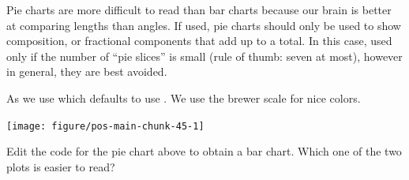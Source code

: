 \documentclass[krantz2]{krantz}\usepackage{knitr}
\begin{document}
\begin{warningbox}
Pie charts are more difficult to read than bar charts because our brain is better at comparing lengths than angles. If used, pie charts should only be used to show composition, or fractional components that add up to a total. In this case, used only if the number of “pie slices” is small (rule of thumb: seven at most), however in general, they are best avoided.
\end{warningbox}

As we use  which defaults to use . We use the brewer scale for nice colors.

\begin{knitrout}\footnotesize
{}\color{fgcolor}\begin{kframe}
\begin{alltt}
\hlstd{(}  \hlstd{(} \hlstd{=} \hlstd{(}\hlstd{),}  \hlstd{=}  \hlopt{+}
  \hlstd{(} \hlstd{=} \hlstd{,}  \hlstd{=} \hlstd{)} \hlopt{+}
  \hlstd{(} \hlstd{=} \hlstd{)} \hlopt{+}
  \hlstd{()} \hlopt{+}
  \hlstd{(} \hlstd{=} \hlstd{)} \hlopt{+}
  \hlstd{(} \hlstd{=} \hlstd{,}  \hlstd{=} \hlstd{)}
\end{alltt}
\end{kframe}

{\centering \texttt{[image: figure/pos-main-chunk-45-1]} 

}


\end{knitrout}

\begin{playground}
Edit the code for the pie chart above to obtain a bar chart. Which one of the two plots is easier to read?
\end{playground}
\end{document}
